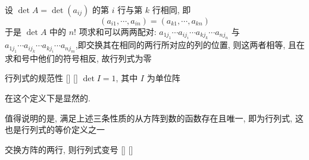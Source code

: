 \documentclass[UTF8]{ctexart}
\DeclareMathOperator{\0}{\mathbf{0}}
\DeclareMathOperator{\<}{\langle}
\renewcommand{\>}{\rangle}
\begin{document}
    \begin{prf}
        设  \(\det A = \det(a_{ij})\)  的第  \(i\)  行与第  \(k\)  行相同, 即
    \[(a_{i1}, \cdots, a_{in}) = (a_{k1}, \cdots, a_{kn})\]于是 \(\det A\) 中的 \(n!\) 项求和可以两两配对:  \(a_{1j_1} \cdots a_{ij_i} \cdots a_{kj_k} \cdots a_{nj_n}\) 与 \(a_{1j_1} \cdots a_{ij_k} \cdots a_{kj_i} \cdots a_{nj_m}\),即交换其在相同的两行所对应的列的位置, 则这两者相等, 且在求和号中他们的符号相反, 故行列式为零
    \end{prf}

    \begin{thm}
			[]
			{行列式的规范性}
			[]
			[]
         \(\det I=1\), 其中 \(I\) 为单位阵
    \end{thm}

    \begin{prf}
        在这个定义下是显然的.
    \end{prf}
    值得说明的是, 满足上述三条性质的从方阵到数的函数存在且唯一, 即为行列式, 这也是行列式的等价定义之一
    \begin{crl}
			[]
			{交换方阵的两行, 则行列式变号}
			[]
			[]
    \end{crl}
\end{document}
